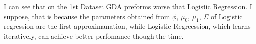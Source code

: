 \begin{answer}
I can see that on the 1st Dataset GDA preforms worse that Logistic Regression. I suppose, that is because the parameters obtained from $\phi$, $\mu_0$, $\mu_1$, $\Sigma$  of Logistic regression are the first approximanation, while Logistic Regrecssion, which learns iteratively, can achieve better perfomance though the time.
\end{answer}
